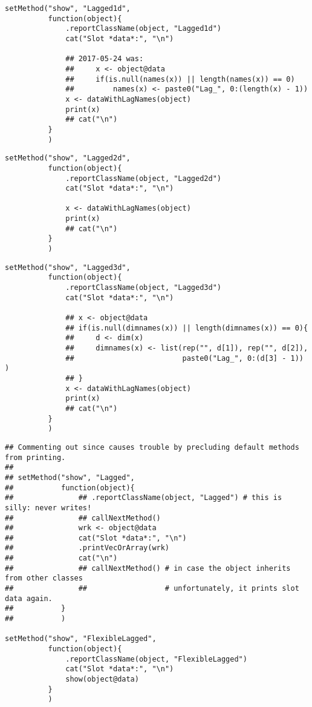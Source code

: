 \documentclass[11pt,a4paper]{article}
\begin{document}
\begin{verbatim}
setMethod("show", "Lagged1d",
          function(object){
              .reportClassName(object, "Lagged1d")
              cat("Slot *data*:", "\n")

              ## 2017-05-24 was:
              ##     x <- object@data
              ##     if(is.null(names(x)) || length(names(x)) == 0)
              ##         names(x) <- paste0("Lag_", 0:(length(x) - 1))
              x <- dataWithLagNames(object)
              print(x)
              ## cat("\n")
          }
          )
\end{verbatim}

\begin{verbatim}
setMethod("show", "Lagged2d",
          function(object){
              .reportClassName(object, "Lagged2d")
              cat("Slot *data*:", "\n")

              x <- dataWithLagNames(object)
              print(x)
              ## cat("\n")
          }
          )
\end{verbatim}


\begin{verbatim}
setMethod("show", "Lagged3d",
          function(object){
              .reportClassName(object, "Lagged3d")
              cat("Slot *data*:", "\n")

              ## x <- object@data
              ## if(is.null(dimnames(x)) || length(dimnames(x)) == 0){
              ##     d <- dim(x)
              ##     dimnames(x) <- list(rep("", d[1]), rep("", d[2]),
              ##                         paste0("Lag_", 0:(d[3] - 1)) )
              ## }
              x <- dataWithLagNames(object)
              print(x)
              ## cat("\n")
          }
          )
\end{verbatim}

\begin{verbatim}
## Commenting out since causes trouble by precluding default methods from printing.
##
## setMethod("show", "Lagged",
##           function(object){
##               ## .reportClassName(object, "Lagged") # this is silly: never writes!
##               ## callNextMethod()
##               wrk <- object@data
##               cat("Slot *data*:", "\n")
##               .printVecOrArray(wrk)
##               cat("\n")
##               ## callNextMethod() # in case the object inherits from other classes
##               ##                  # unfortunately, it prints slot data again.
##           }
##           )

setMethod("show", "FlexibleLagged",
          function(object){
              .reportClassName(object, "FlexibleLagged")
              cat("Slot *data*:", "\n")
              show(object@data)
          }
          )
\end{verbatim}
\end{document}
